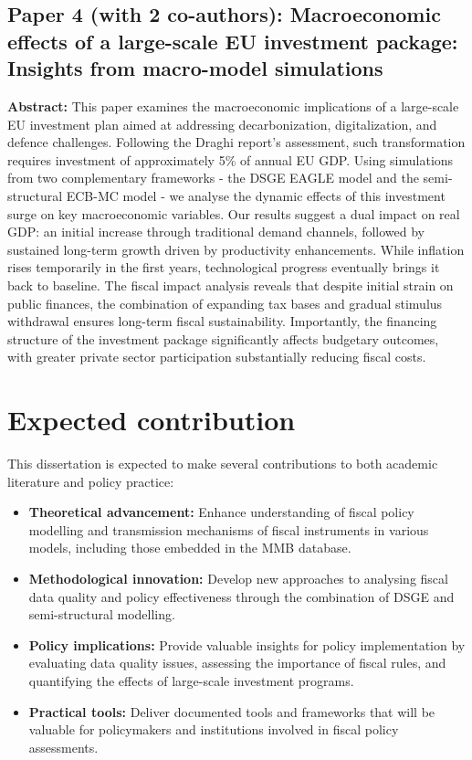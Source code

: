 \documentclass[11pt,a4paper]{article}
\begin{document}
\subsection*{Paper 4 (with 2 co-authors): Macroeconomic effects of a large-scale EU investment package: Insights from macro-model simulations}
\textbf{Abstract:} This paper examines the macroeconomic implications of a large-scale EU investment plan aimed at addressing decarbonization, digitalization, and defence challenges. Following the Draghi report's assessment, such transformation requires investment of approximately 5\% of annual EU GDP. Using simulations from two complementary frameworks - the DSGE EAGLE model and the semi-structural ECB-MC model - we analyse the dynamic effects of this investment surge on key macroeconomic variables. Our results suggest a dual impact on real GDP: an initial increase through traditional demand channels, followed by sustained long-term growth driven by productivity enhancements. While inflation rises temporarily in the first years, technological progress eventually brings it back to baseline. The fiscal impact analysis reveals that despite initial strain on public finances, the combination of expanding tax bases and gradual stimulus withdrawal ensures long-term fiscal sustainability. Importantly, the financing structure of the investment package significantly affects budgetary outcomes, with greater private sector participation substantially reducing fiscal costs.

\section*{Expected contribution}
This dissertation is expected to make several contributions to both academic literature and policy practice:

\begin{itemize}[wide=0pt]
    \item \textbf{Theoretical advancement:} Enhance understanding of fiscal policy modelling and transmission mechanisms of fiscal instruments in various models, including those embedded in the MMB database.
    
    \item \textbf{Methodological innovation:} Develop new approaches to analysing fiscal data quality and policy effectiveness through the combination of DSGE and semi-structural modelling.
    
    \item \textbf{Policy implications:} Provide valuable insights for policy implementation by evaluating data quality issues, assessing the importance of fiscal rules, and quantifying the effects of large-scale investment programs.
    
    \item \textbf{Practical tools:} Deliver documented tools and frameworks that will be valuable for policymakers and institutions involved in fiscal policy assessments.
\end{itemize}
\end{document}
